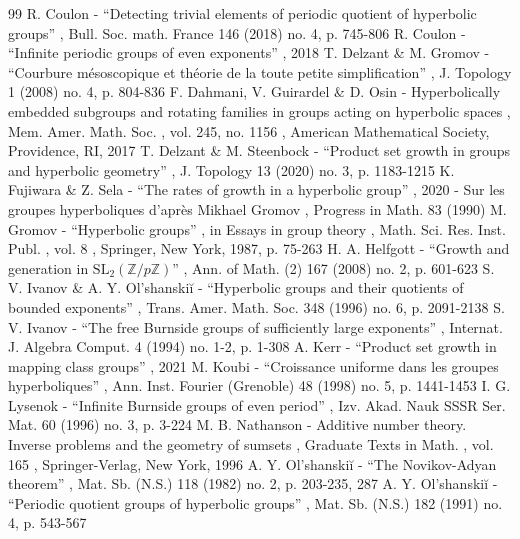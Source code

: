 \documentclass[11pt]{article}
\theoremstyle{plain}
\theoremstyle{definition}
\begin{document}
\begin{thebibliography}{99}
 R. Coulon - “Detecting trivial elements of periodic quotient of hyperbolic groups” , Bull. Soc. math. France 146 (2018) no. 4, p. 745-806
 R. Coulon - “Infinite periodic groups of even exponents” , 2018
 T. Delzant \& M. Gromov - “Courbure mésoscopique et théorie de la toute petite simplification” , J. Topology 1 (2008) no. 4, p. 804-836
 F. Dahmani, V. Guirardel \& D. Osin - Hyperbolically embedded subgroups and rotating families in groups acting on hyperbolic spaces , Mem. Amer. Math. Soc. , vol. 245, no. 1156 , American Mathematical Society, Providence, RI, 2017
 T. Delzant \& M. Steenbock - “Product set growth in groups and hyperbolic geometry” , J. Topology 13 (2020) no. 3, p. 1183-1215
 K. Fujiwara \& Z. Sela - “The rates of growth in a hyperbolic group” , 2020
 - Sur les groupes hyperboliques d’après Mikhael Gromov , Progress in Math. 83 (1990)
 M. Gromov - “Hyperbolic groups” , in Essays in group theory , Math. Sci. Res. Inst. Publ. , vol. 8 , Springer, New York, 1987, p. 75-263
 H. A. Helfgott - “Growth and generation in $\mathrm{SL}_2(\mathbb{Z}/p\mathbb{Z})$” , Ann. of Math. (2) 167 (2008) no. 2, p. 601-623
 S. V. Ivanov \& A. Y. Ol’shanskiĭ - “Hyperbolic groups and their quotients of bounded exponents” , Trans. Amer. Math. Soc. 348 (1996) no. 6, p. 2091-2138
 S. V. Ivanov - “The free Burnside groups of sufficiently large exponents” , Internat. J. Algebra Comput. 4 (1994) no. 1-2, p. 1-308
 A. Kerr - “Product set growth in mapping class groups” , 2021
 M. Koubi - “Croissance uniforme dans les groupes hyperboliques” , Ann. Inst. Fourier (Grenoble) 48 (1998) no. 5, p. 1441-1453
 I. G. Lysenok - “Infinite Burnside groups of even period” , Izv. Akad. Nauk SSSR Ser. Mat. 60 (1996) no. 3, p. 3-224
 M. B. Nathanson - Additive number theory. Inverse problems and the geometry of sumsets , Graduate Texts in Math. , vol. 165 , Springer-Verlag, New York, 1996
 A. Y. Ol’shanskiĭ - “The Novikov-Adyan theorem” , Mat. Sb. (N.S.) 118 (1982) no. 2, p. 203-235, 287
 A. Y. Ol’shanskiĭ - “Periodic quotient groups of hyperbolic groups” , Mat. Sb. (N.S.) 182 (1991) no. 4, p. 543-567

\end{thebibliography}
\end{document}
